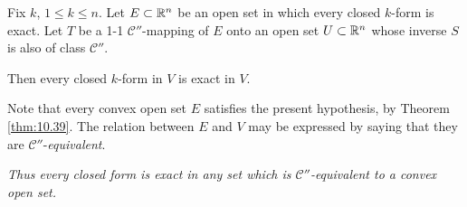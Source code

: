 \begin{thm}
    \label{thm:10.40}
    Fix $k$, $1 \leq k \leq n$. 
    Let $E \subset {\protect\mathbb R}^n$ be an open set in which every closed $k$-form is exact. 
    Let $T$ be a 1-1 $\mathscr{C}''$-mapping of $E$ onto an open set $U \subset {\protect\mathbb R}^n$ 
    whose inverse $S$ is also of class $\mathscr{C}''$.
    
    Then every closed $k$-form in $V$ is exact in $V$.
\end{thm}

Note that every convex open set $E$ satisfies the present hypothesis, by
Theorem \ref{thm:10.39}. 
The relation between $E$ and $V$ may be expressed by saying
that they are $\mathscr{C}''$-\emph{equivalent}.

\emph{Thus every closed form is exact in any set which is $\mathscr{C}''$-equivalent to a convex open set.}

\begin{myRemark}
    
\end{myRemark}